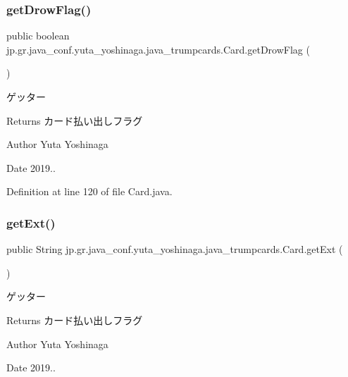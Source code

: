 \subsubsection{\texorpdfstring{get\+Drow\+Flag()}{getDrowFlag()}}
{\footnotesize\ttfamily public boolean jp.\+gr.\+java\+\_\+conf.\+yuta\+\_\+yoshinaga.\+java\+\_\+trumpcards.\+Card.\+get\+Drow\+Flag (\begin{DoxyParamCaption}{ }\end{DoxyParamCaption})}



ゲッター 

\begin{DoxyReturn}{Returns}
カード払い出しフラグ 
\end{DoxyReturn}
\begin{DoxyAuthor}{Author}
Yuta Yoshinaga 
\end{DoxyAuthor}
\begin{DoxyDate}{Date}
2019.. 
\end{DoxyDate}


Definition at line 120 of file Card.\+java.

\mbox{\label{classjp_1_1gr_1_1java__conf_1_1yuta__yoshinaga_1_1java__trumpcards_1_1_card_ad24d31ccf25cf1eb2ad4304aa5f775cf}} 
\subsubsection{\texorpdfstring{get\+Ext()}{getExt()}}
{\footnotesize\ttfamily public String jp.\+gr.\+java\+\_\+conf.\+yuta\+\_\+yoshinaga.\+java\+\_\+trumpcards.\+Card.\+get\+Ext (\begin{DoxyParamCaption}{ }\end{DoxyParamCaption})}



ゲッター 

\begin{DoxyReturn}{Returns}
カード払い出しフラグ 
\end{DoxyReturn}
\begin{DoxyAuthor}{Author}
Yuta Yoshinaga 
\end{DoxyAuthor}
\begin{DoxyDate}{Date}
2019.. 
\end{DoxyDate}


